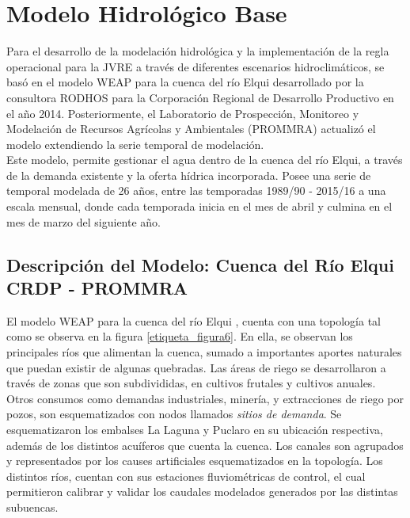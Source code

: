\documentclass[11pt,]{article}
\begin{document}
\section{Modelo Hidrológico Base}\bigskip

Para el desarrollo de la modelación hidrológica y la implementación de la regla operacional para la JVRE a través de diferentes escenarios hidroclimáticos, se basó en el modelo WEAP para la cuenca del río Elqui desarrollado por la consultora RODHOS para la Corporación Regional de Desarrollo Productivo en el año 2014. Posteriormente, el Laboratorio de Prospección, Monitoreo y Modelación de Recursos Agrícolas y Ambientales (PROMMRA) actualizó el modelo extendiendo la serie temporal de modelación.\\

Este modelo, permite gestionar el agua dentro de la cuenca del río Elqui, a través de la demanda existente y la oferta hídrica incorporada. Posee una serie de temporal modelada de 26 años, entre las temporadas 1989/90 - 2015/16 a una escala mensual, donde cada temporada inicia en el mes de abril y culmina en el mes de marzo del siguiente año. \\

	\subsection{Descripción del Modelo: Cuenca del Río Elqui CRDP - PROMMRA}\bigskip
	
	El modelo WEAP para la cuenca del río Elqui , cuenta con una topología tal como se observa en la figura \ref{etiqueta_figura6}. En ella, se observan los principales ríos que alimentan la cuenca, sumado a  importantes aportes naturales que puedan existir de algunas quebradas. Las áreas de riego se desarrollaron a través de zonas que son subdivididas, en cultivos frutales y cultivos anuales. Otros consumos como demandas industriales, minería, y extracciones de riego por pozos, son esquematizados con nodos llamados \textit{sitios de demanda}. Se esquematizaron los embalses La Laguna y Puclaro en su ubicación respectiva, además de los distintos acuíferos que cuenta la cuenca. Los canales son agrupados y representados por los causes artificiales esquematizados en la topología.  Los distintos ríos, cuentan con sus estaciones fluviométricas de control, el cual permitieron calibrar y validar los caudales modelados generados por las distintas subuencas.
\end{document}
